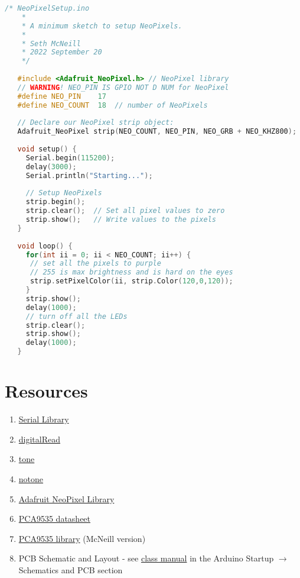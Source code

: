 \begin{lstlisting}[language=C++, caption={This snippet shows how to setup and run the NeoPixels on the board.},label={lst:neopixelsetup}]
    /* NeoPixelSetup.ino
    * 
    * A minimum sketch to setup NeoPixels.
    * 
    * Seth McNeill
    * 2022 September 20
    */
   
   #include <Adafruit_NeoPixel.h> // NeoPixel library
   // WARNING! NEO_PIN IS GPIO NOT D NUM for NeoPixel
   #define NEO_PIN    17  
   #define NEO_COUNT  18  // number of NeoPixels
   
   // Declare our NeoPixel strip object:
   Adafruit_NeoPixel strip(NEO_COUNT, NEO_PIN, NEO_GRB + NEO_KHZ800);
   
   void setup() {
     Serial.begin(115200);
     delay(3000);
     Serial.println("Starting...");
   
     // Setup NeoPixels
     strip.begin();
     strip.clear();  // Set all pixel values to zero
     strip.show();   // Write values to the pixels
   }
   
   void loop() {
     for(int ii = 0; ii < NEO_COUNT; ii++) {
      // set all the pixels to purple
      // 255 is max brightness and is hard on the eyes
      strip.setPixelColor(ii, strip.Color(120,0,120));
     }
     strip.show();
     delay(1000);
     // turn off all the LEDs
     strip.clear();
     strip.show();
     delay(1000);
   }   
\end{lstlisting}

\section{Resources}\label{sec:buttonserialresources}
\begin{enumerate}
    \item \href{https://www.arduino.cc/reference/en/language/functions/communication/serial/}{Serial Library}
    \item \href{https://www.arduino.cc/reference/en/language/functions/digital-io/digitalread/}{digitalRead}
    \item \href{https://www.arduino.cc/reference/en/language/functions/advanced-io/tone/}{tone}
    \item \href{https://www.arduino.cc/reference/en/language/functions/advanced-io/notone/}{notone}
    \item \href{https://www.arduino.cc/reference/en/libraries/adafruit-neopixel/}{Adafruit NeoPixel Library}
    \item \href{https://www.nxp.com/docs/en/data-sheet/PCA9535_PCA9535C.pdf}{PCA9535 datasheet}
    \item \href{https://github.com/semcneil/PCA95x5}{PCA9535 library} (McNeill version)
    \item PCB Schematic and Layout - see 
            \href{https://github.com/semcneil/Fundamentals-of-Microcontrollers-Manual}{class manual} 
            in the Arduino Startup $\rightarrow$ Schematics and PCB section
\end{enumerate}

